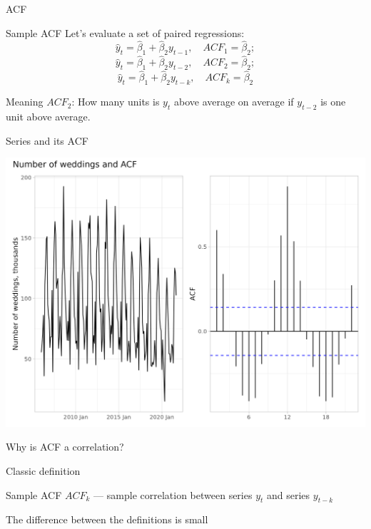 \begin{frame}{ACF}
	
	\begin{block}{Sample ACF}
		Let's evaluate a set of paired regressions:
		\[
		\hat y_t = \hat\beta_1 + \hat\beta_2 y_{t-1}, \quad ACF_1 = \hat\beta_2;
		\]
		\pause
		\[
		\hat y_t = \hat\beta_1 + \hat\beta_2 y_{t-2}, \quad ACF_2 = \hat\beta_2;
		\]
		\pause
		\[
		\hat y_t = \hat\beta_1 + \hat\beta_2 y_{t-k}, \quad ACF_k = \hat\beta_2
		\]
	\end{block}
	
	\pause
	\alert{Meaning}
	$ACF_2$: How many units is $y_t$ above average on average if $y_{t-2}$ is one unit above average.
	
\end{frame}


\begin{frame}{Series and its ACF}
	
	\includegraphics[width=\textwidth]{pictures/om_ts_01-120.png}
	
\end{frame}

\begin{frame}{Why is ACF a correlation?}
	
	\alert{Classic definition}
	
	\begin{block}{Sample ACF}
		$ACF_k$ — sample correlation between series $y_t$ and series $y_{t-k}$
	\end{block}
	
	\pause
	The difference between the definitions is \alert{small}
	
\end{frame}


